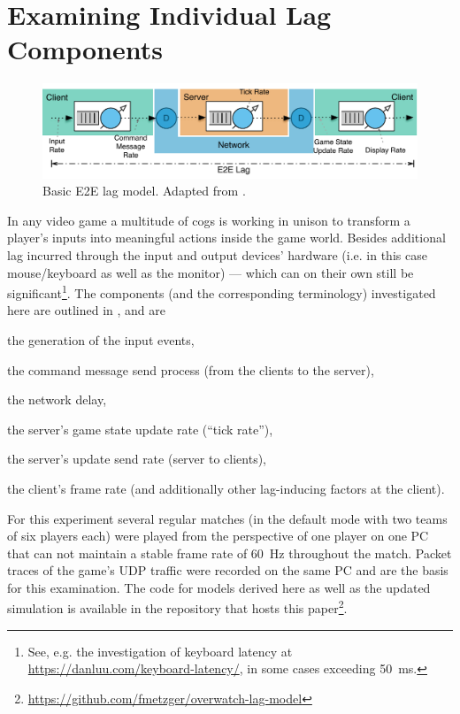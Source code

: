 \section{Examining Individual Lag Components}
\label{sec:lagmodel}

\begin{figure}[t]
	\centering
	\includegraphics[width=1.0\textwidth]{images/e2e-lag-model.pdf}
	\caption{Basic \acrshort{E2E} lag model. Adapted from \cite{Metzger+2016}.}
\label{fig:e2e-lag-model}
\end{figure}

In any video game a multitude of cogs is working in unison to transform a player's inputs into meaningful actions inside the game world. Besides additional lag incurred through the input and output devices' hardware (i.e. in this case mouse/keyboard as well as the monitor) --- which can on their own still be significant\footnote{See, e.g. the investigation of keyboard latency at \url{https://danluu.com/keyboard-latency/}, in some cases exceeding \SI{50}{\milli\second}.}. The components (and the corresponding terminology) investigated here are outlined in \cite{Metzger+2016}, and are 
\begin{enumerate*}[label=(\alph*)]
	\item the generation of the input events,
	\item the command message send process (from the clients to the server),
	\item the network delay,
	\item the server's game state update rate (``tick rate''),
	\item the server's update send rate (server to clients),
	\item the client's frame rate (and additionally other lag-inducing factors at the client).
\end{enumerate*}
%
%
For this experiment several regular matches (in the default mode with two teams of six players each) were played from the perspective of one player on one PC that can not maintain a stable frame rate of \SI{60}{\hertz} throughout the match. Packet traces of the game's UDP traffic were recorded on the same PC and are the basis for this examination. The code for models derived here as well as the updated simulation is available in the repository that hosts this paper\footnote{\url{https://github.com/fmetzger/overwatch-lag-model}}.



